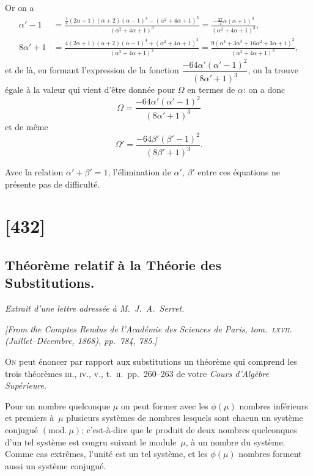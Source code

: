 \documentclass[11pt,a4paper]{article}
\theoremstyle{plain}
\theoremstyle{definition}
\begin{document}
Or on a
\begin{align*}
\alpha' - 1 &= \frac{\tfrac{1}{4}(2\alpha + 1)(\alpha + 2)(\alpha - 1)^4 - (\alpha^2 + 4\alpha + 1)^3}{(\alpha^2 + 4\alpha + 1)^3}
= \frac{-\tfrac{27}{4}\alpha(\alpha + 1)^4}{(\alpha^2 + 4\alpha + 1)^3}, \\
8\alpha' + 1 &= \frac{4(2\alpha + 1)(\alpha + 2)(\alpha - 1)^4 + (\alpha^2 + 4\alpha + 1)^3}{(\alpha^2 + 4\alpha + 1)^3}
= \frac{9(\alpha^4 + 3\alpha^3 + 16\alpha^2 + 3\alpha + 1)^2}{(\alpha^2 + 4\alpha + 1)^3},
\end{align*}
et de l\`a, en formant l'expression de la fonction $\dfrac{-64\alpha'(\alpha' - 1)^2}{(8\alpha' + 1)^3}$, on la trouve \'egale \`a
la valeur qui vient d'\^etre donn\'ee pour $\Omega$ en termes de $\alpha$: on a donc
\[
\Omega = \frac{-64\alpha'(\alpha' - 1)^2}{(8\alpha' + 1)^3}
\]
et de m\^eme
\[
\Omega' = \frac{-64\beta'(\beta' - 1)^2}{(8\beta' + 1)^3}.
\]

Avec la relation $\alpha' + \beta' = 1$, l'\'elimination de $\alpha'$, $\beta'$ entre ces \'equations ne pr\'esente
pas de difficult\'e.

\clearpage

\section{[432]}
\subsection{Th\'eor\`eme relatif \`a la Th\'eorie des Substitutions.}
\begin{center}
\textit{Extrait d'une lettre adress\'ee \`a M.\ J.\ A.\ Serret.}
\end{center}

\begin{center}
\textit{[From the Comptes Rendus de l'Acad\'emie des Sciences de Paris, tom.~\textsc{lxvii}.
(Juillet--D\'ecembre, 1868), pp.~784, 785.]}
\end{center}

\textsc{On} peut \'enoncer par rapport aux substitutions un th\'eor\`eme qui comprend les
trois th\'eor\`emes \textsc{iii}., \textsc{iv}., \textsc{v}., t.~\textsc{ii}.\ pp.~260--263 de votre \textit{Cours d'Alg\`ebre Sup\'erieure}.

Pour un nombre quelconque $\mu$ on peut former avec les $\phi(\mu)$ nombres inf\'erieurs
et premiers \`a~$\mu$ plusieurs syst\`emes de nombres lesquels sont chacun un syst\`eme
conjugu\'e $(\mathrm{mod.}\ \mu)$; c'est-\`a-dire que le produit de deux nombres quelconques d'un tel
syst\`eme est congru suivant le module~$\mu$, \`a un nombre du syst\`eme.  Comme cas
extr\^emes, l'unit\'e est un tel syst\`eme, et les $\phi(\mu)$ nombres forment aussi un syst\`eme
conjugu\'e.
\end{document}
